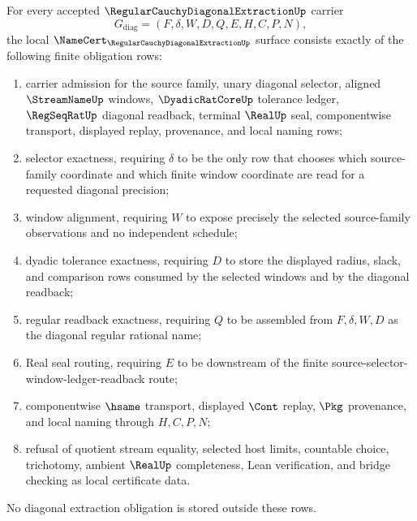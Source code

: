 \begin{theorem}
\label{thm:regular-cauchy-diagonal-extraction-namecert-obligations}
For every accepted $\RegularCauchyDiagonalExtractionUp$ carrier
$$
G_{\mathrm{diag}}=(F,\delta,W,D,Q,E,H,C,P,N),
$$
the local $\NameCert_{\RegularCauchyDiagonalExtractionUp}$ surface consists exactly of the following finite obligation rows:
\begin{enumerate}
\item carrier admission for the source family, unary diagonal selector, aligned $\StreamNameUp$ windows, $\DyadicRatCoreUp$ tolerance ledger, $\RegSeqRatUp$ diagonal readback, terminal $\RealUp$ seal, componentwise transport, displayed replay, provenance, and local naming rows;
\item selector exactness, requiring $\delta$ to be the only row that chooses which source-family coordinate and which finite window coordinate are read for a requested diagonal precision;
\item window alignment, requiring $W$ to expose precisely the selected source-family observations and no independent schedule;
\item dyadic tolerance exactness, requiring $D$ to store the displayed radius, slack, and comparison rows consumed by the selected windows and by the diagonal readback;
\item regular readback exactness, requiring $Q$ to be assembled from $F,\delta,W,D$ as the diagonal regular rational name;
\item Real seal routing, requiring $E$ to be downstream of the finite source-selector-window-ledger-readback route;
\item componentwise $\hsame$ transport, displayed $\Cont$ replay, $\Pkg$ provenance, and local naming through $H,C,P,N$;
\item refusal of quotient stream equality, selected host limits, countable choice, trichotomy, ambient $\RealUp$ completeness, Lean verification, and bridge checking as local certificate data.
\end{enumerate}
No diagonal extraction obligation is stored outside these rows.
\end{theorem}
